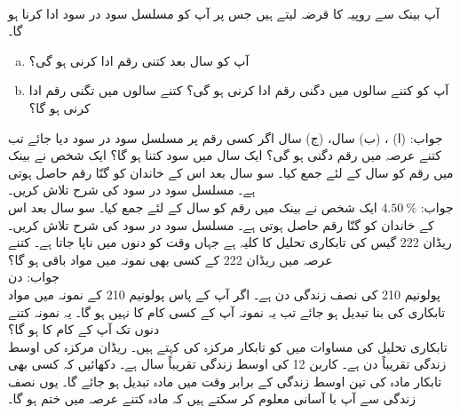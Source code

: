 \\
آپ بینک سے  روپیہ کا قرضہ لیتے ہیں جس پر آپ کو  مسلسل سود در سود ادا کرنا ہو گا۔
\begin{enumerate}[a.]
\item
 آپ کو  سال بعد کتنی رقم ادا کرنی ہو گی؟
\item
آپ کو کتنے سالوں میں دگنی رقم ادا کرنی ہو گی؟ کتنے سالوں میں تگنی رقم ادا کرنی ہو گا؟ 
\end{enumerate}
جواب:\quad
(ا) ، (ب)  سال، (ج)  سال
اگر کسی رقم پر  مسلسل سود در سود دیا جائے تب کتنے عرصہ میں رقم دگنی ہو گی؟ ایک سال میں سود کتنا ہو گا؟
ایک شخص نے بینک میں رقم کو  سال کے لئے جمع کیا۔ سو سال بعد اس کے خاندان کو  گنّا رقم حاصل ہوتی ہے۔ مسلسل سود در سود کی شرح تلاش کریں۔\\
جواب:\quad
$\SI{4.50}{\percent}$
ایک شخص نے بینک میں رقم کو  سال کے لئے جمع کیا۔ سو سال بعد اس کے خاندان کو  گنّا رقم حاصل ہوتی ہے۔ مسلسل سود در سود کی شرح تلاش کریں۔
\\
ریڈان 222 گیس کی تابکاری تحلیل کا کلیہ  ہے جہاں وقت  کو دنوں میں ناپا جاتا ہے۔ کتنے عرصہ میں ریڈان 222 کے کسی بھی نمونہ میں  مواد باقی ہو گا؟\\
جواب:\quad
{} دن
\\
پولونیم 210 کی نصف زندگی   دن ہے۔ اگر آپ کے پاس پولونیم 210 کے نمونہ میں  مواد تابکاری کی بنا تبدیل ہو جائے تب یہ نمونہ آپ کے کسی کام کا نہیں ہو گا۔ یہ نمونہ کتنے دنوں تک آپ کے کام کا ہو گا؟
\\
تابکاری تحلیل کی مساوات  میں   کو تابکار مرکزہ کی  کہتے ہیں۔ ریڈان مرکزہ کی اوسط زندگی تقریباً  دن ہے۔ کاربن 12 کی اوسط زندگی تقریباً  سال ہے۔ دکھائیں کہ کسی بھی تابکار مادہ کی تین اوسط زندگی کے برابر وقت میں  مادہ تبدیل ہو جائے گا۔ یوں نصف زندگی سے آپ با آسانی معلوم کر سکتے ہیں کہ مادہ کتنے عرصہ میں  ختم ہو گا۔
